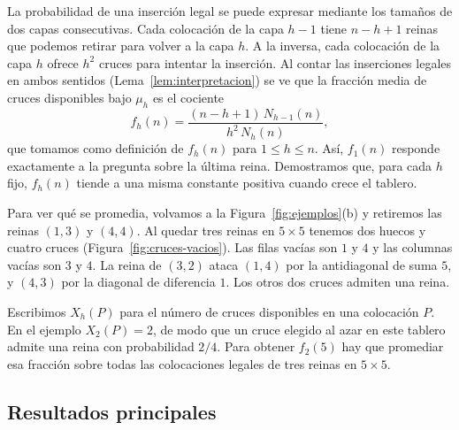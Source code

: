 La probabilidad de una inserción legal se puede expresar mediante los tamaños de dos
capas consecutivas. Cada colocación de la capa $h-1$ tiene $n-h+1$ reinas que
podemos retirar para volver a la capa $h$. A la inversa, cada colocación de la
capa $h$ ofrece $h^2$ cruces para intentar la inserción. Al contar las inserciones
legales en ambos sentidos (Lema~\ref{lem:interpretacion}) se ve que la fracción media de
cruces disponibles bajo $\mu_h$ es el cociente
\begin{equation}\label{eq:fh}
 f_h(n)=\frac{(n-h+1)\,N_{h-1}(n)}{h^2\,N_h(n)} ,
\end{equation}
que tomamos como definición de $f_h(n)$ para $1\le h\le n$. Así, $f_1(n)$ responde
exactamente a la pregunta sobre la última reina. Demostramos que, para cada $h$ fijo,
$f_h(n)$ tiende a una misma constante positiva cuando crece el tablero.

Para ver qué se promedia, volvamos a la Figura~\ref{fig:ejemplos}(b) y
retiremos las reinas $(1,3)$ y $(4,4)$. Al quedar tres reinas en $5\times5$
tenemos dos huecos y cuatro cruces (Figura~\ref{fig:cruces-vacios}). Las filas
vacías son $1$ y $4$ y las columnas vacías son $3$ y $4$. La reina de $(3,2)$
ataca $(1,4)$ por la antidiagonal de suma $5$, y $(4,3)$ por la diagonal de
diferencia $1$. Los otros dos cruces admiten una reina.



Escribimos $X_h(P)$ para el número de cruces disponibles en una colocación $P$.
En el ejemplo $X_2(P)=2$, de modo que un cruce elegido al azar en este tablero
admite una reina con probabilidad $2/4$. Para obtener $f_2(5)$ hay que promediar
esa fracción sobre todas las colocaciones legales de tres reinas en $5\times5$.

\subsection{Resultados principales}

